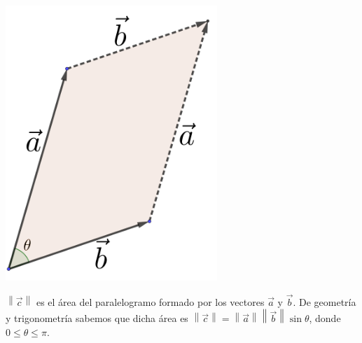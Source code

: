 \documentclass[12pt, fleqn]{report}                             %
\theoremstyle{break}                                            %
\newcommand{\Abs}[1]{\left\lVert #1 \right\lVert}               %
\begin{document}
                \begin{minipage}{0.30\textwidth}
                    \includegraphics[width=0.60\textwidth]{parallelogram}
                \end{minipage}
                \begin{minipage}[t]{.65\textwidth}

                    $\Abs{\vec{c}}$ es el área del paralelogramo formado por los vectores $\vec{a}$ y $\vec{b}$.
                    De geometría y trigonometría sabemos que dicha área es 
                    $\Abs{\vec{c}} = \Abs{\vec{a}} \Abs{\vec{b}} \sin \theta$, donde $0 \leq \theta \leq \pi$.

                \end{minipage}

                \vspace{2em}
                
\end{document}
